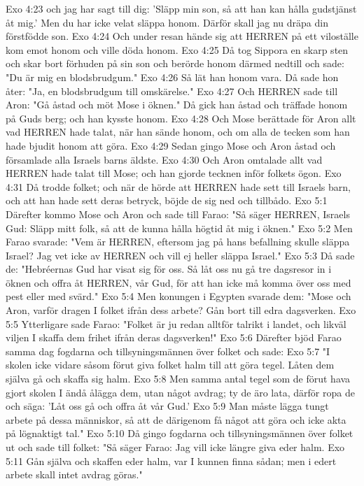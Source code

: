 Exo 4:23  och jag har sagt till dig: 'Släpp min son, så att han kan hålla gudstjänst åt mig.' Men du har icke velat släppa honom. Därför skall jag nu dräpa din förstfödde son.
Exo 4:24  Och under resan hände sig att HERREN på ett viloställe kom emot honom och ville döda honom.
Exo 4:25  Då tog Sippora en skarp sten och skar bort förhuden på sin son och berörde honom därmed nedtill och sade: "Du är mig en blodsbrudgum."
Exo 4:26  Så lät han honom vara. Då sade hon åter: "Ja, en blodsbrudgum till omskärelse."
Exo 4:27  Och HERREN sade till Aron: "Gå åstad och möt Mose i öknen." Då gick han åstad och träffade honom på Guds berg; och han kysste honom.
Exo 4:28  Och Mose berättade för Aron allt vad HERREN hade talat, när han sände honom, och om alla de tecken som han hade bjudit honom att göra.
Exo 4:29  Sedan gingo Mose och Aron åstad och församlade alla Israels barns äldste.
Exo 4:30  Och Aron omtalade allt vad HERREN hade talat till Mose; och han gjorde tecknen inför folkets ögon.
Exo 4:31  Då trodde folket; och när de hörde att HERREN hade sett till Israels barn, och att han hade sett deras betryck, böjde de sig ned och tillbådo.
Exo 5:1  Därefter kommo Mose och Aron och sade till Farao: "Så säger HERREN, Israels Gud: Släpp mitt folk, så att de kunna hålla högtid åt mig i öknen."
Exo 5:2  Men Farao svarade: "Vem är HERREN, eftersom jag på hans befallning skulle släppa Israel? Jag vet icke av HERREN och vill ej heller släppa Israel."
Exo 5:3  Då sade de: "Hebréernas Gud har visat sig för oss. Så låt oss nu gå tre dagsresor in i öknen och offra åt HERREN, vår Gud, för att han icke må komma över oss med pest eller med svärd."
Exo 5:4  Men konungen i Egypten svarade dem: "Mose och Aron, varför dragen I folket ifrån dess arbete? Gån bort till edra dagsverken.
Exo 5:5  Ytterligare sade Farao: "Folket är ju redan alltför talrikt i landet, och likväl viljen I skaffa dem frihet ifrån deras dagsverken!"
Exo 5:6  Därefter bjöd Farao samma dag fogdarna och tillsyningsmännen över folket och sade:
Exo 5:7  "I skolen icke vidare såsom förut giva folket halm till att göra tegel. Låten dem själva gå och skaffa sig halm.
Exo 5:8  Men samma antal tegel som de förut hava gjort skolen I ändå ålägga dem, utan något avdrag; ty de äro lata, därför ropa de och säga: 'Låt oss gå och offra åt vår Gud.'
Exo 5:9  Man måste lägga tungt arbete på dessa människor, så att de därigenom få något att göra och icke akta på lögnaktigt tal."
Exo 5:10  Då gingo fogdarna och tillsyningsmännen över folket ut och sade till folket: "Så säger Farao: Jag vill icke längre giva eder halm.
Exo 5:11  Gån själva och skaffen eder halm, var I kunnen finna sådan; men i edert arbete skall intet avdrag göras."
